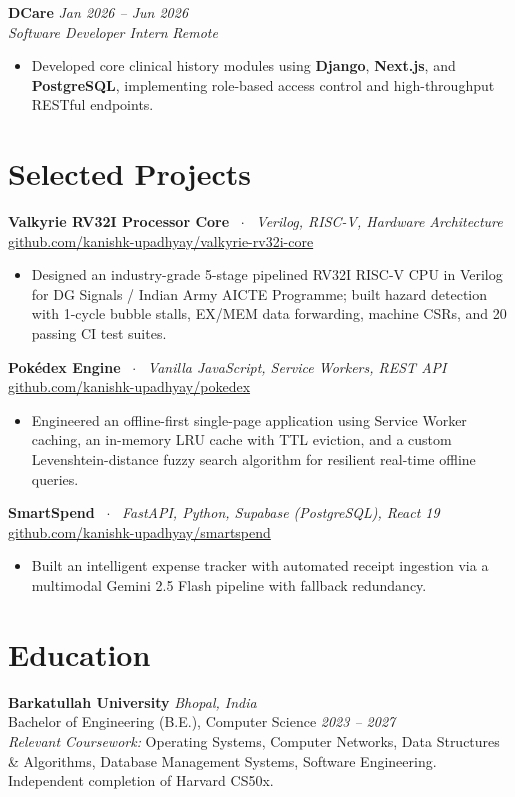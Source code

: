 \documentclass[10pt,a4paper]{article}
\begin{document}
\textbf{DCare} \hfill \textit{Jan 2026 -- Jun 2026} \\
\textit{Software Developer Intern} \hfill \textit{Remote}
\begin{itemize}
    \item Developed core clinical history modules using \textbf{Django}, \textbf{Next.js}, and \textbf{PostgreSQL}, implementing role-based access control and high-throughput RESTful endpoints.
\end{itemize}

\section{Selected Projects}
\textbf{Valkyrie RV32I Processor Core} \ $\cdot$ \ \textit{Verilog, RISC-V, Hardware Architecture} \hfill \href{https://github.com/kanishk-upadhyay/valkyrie-rv32i-core}{github.com/kanishk-upadhyay/valkyrie-rv32i-core}
\begin{itemize}
    \item Designed an industry-grade 5-stage pipelined RV32I RISC-V CPU in Verilog for DG Signals / Indian Army AICTE Programme; built hazard detection with 1-cycle bubble stalls, EX/MEM data forwarding, machine CSRs, and 20 passing CI test suites.
\end{itemize}

\textbf{Pokédex Engine} \ $\cdot$ \ \textit{Vanilla JavaScript, Service Workers, REST API} \hfill \href{https://github.com/kanishk-upadhyay/pokedex}{github.com/kanishk-upadhyay/pokedex}
\begin{itemize}
    \item Engineered an offline-first single-page application using Service Worker caching, an in-memory LRU cache with TTL eviction, and a custom Levenshtein-distance fuzzy search algorithm for resilient real-time offline queries.
\end{itemize}

\textbf{SmartSpend} \ $\cdot$ \ \textit{FastAPI, Python, Supabase (PostgreSQL), React 19} \hfill \href{https://github.com/kanishk-upadhyay/smartspend}{github.com/kanishk-upadhyay/smartspend}
\begin{itemize}
    \item Built an intelligent expense tracker with automated receipt ingestion via a multimodal Gemini 2.5 Flash pipeline with fallback redundancy.
\end{itemize}

\section{Education}
\textbf{Barkatullah University} \hfill \textit{Bhopal, India} \\
Bachelor of Engineering (B.E.), Computer Science \hfill \textit{2023 -- 2027} \\
\textit{Relevant Coursework:} Operating Systems, Computer Networks, Data Structures \& Algorithms, Database Management Systems, Software Engineering. Independent completion of Harvard CS50x.
\end{document}

